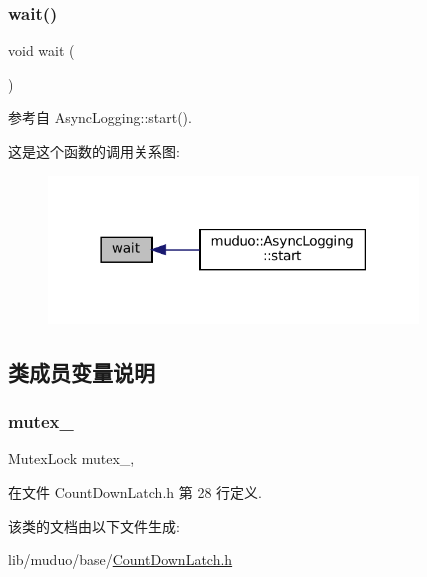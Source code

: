 \subsubsection{\texorpdfstring{wait()}{wait()}}
{\footnotesize\ttfamily void wait (\begin{DoxyParamCaption}{ }\end{DoxyParamCaption})}



参考自 Async\+Logging\+::start().

这是这个函数的调用关系图\+:
\nopagebreak
\begin{figure}[H]
\begin{center}
\leavevmode
\includegraphics[width=278pt]{classmuduo_1_1CountDownLatch_aa3b21853f890838c88d047d6c2786917_icgraph}
\end{center}
\end{figure}


\subsection{类成员变量说明}
\mbox{\label{classmuduo_1_1CountDownLatch_a6e1bf1809a42f40f1a21178dc6620a6f}} 
\subsubsection{\texorpdfstring{mutex\+\_\+}{mutex\_}}
{\footnotesize\ttfamily Mutex\+Lock mutex\+\_\+\hspace{0.3cm}{\ttfamily [mutable]}, {\ttfamily [private]}}



在文件 Count\+Down\+Latch.\+h 第 28 行定义.



该类的文档由以下文件生成\+:\begin{DoxyCompactItemize}
\item 
lib/muduo/base/\hyperlink{CountDownLatch_8h}{Count\+Down\+Latch.\+h}\end{DoxyCompactItemize}
